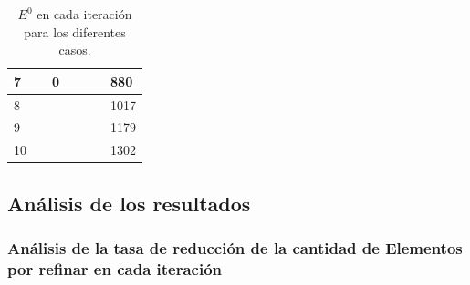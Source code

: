 \begin{table}[!ht]
\begin{tabular}{|lllllll|}
\multicolumn{1}{|l|}{7}                     & \multicolumn{1}{l|}{}                     & \multicolumn{1}{l|}{0}                       & \multicolumn{1}{l|}{}                   & \multicolumn{1}{l|}{}                   & \multicolumn{1}{l|}{}                     & 880               \\ \hline
\multicolumn{1}{|l|}{8}                     & \multicolumn{1}{l|}{}                     & \multicolumn{1}{l|}{}                        & \multicolumn{1}{l|}{}                   & \multicolumn{1}{l|}{}                   & \multicolumn{1}{l|}{}                     & 1017              \\ \hline
\multicolumn{1}{|l|}{9}                     & \multicolumn{1}{l|}{}                     & \multicolumn{1}{l|}{}                        & \multicolumn{1}{l|}{}                   & \multicolumn{1}{l|}{}                   & \multicolumn{1}{l|}{}                     & 1179              \\ \hline
\multicolumn{1}{|l|}{10}                    & \multicolumn{1}{l|}{}                     & \multicolumn{1}{l|}{}                        & \multicolumn{1}{l|}{}                   & \multicolumn{1}{l|}{}                   & \multicolumn{1}{l|}{}                     & 1302              \\ \hline
\end{tabular}
\caption{ $E^0$ en cada iteración para los diferentes casos. }
\label{table:num_els_ref}
\end{table}

\subsection{Análisis de los resultados}


\subsubsection{ Análisis de la tasa de reducción de la cantidad de Elementos por refinar en cada iteración }

